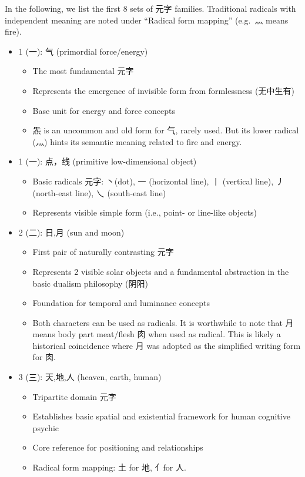 \documentclass[
]{article}
\providecommand{\tightlist}{%
  \setlength{\itemsep}{0pt}\setlength{\parskip}{0pt}}
\begin{document}
In the following, we list the first 8 sets of 元字 families. Traditional
radicals with independent meaning are noted under ``Radical form
mapping'' (e.g.~灬 means fire).

\begin{itemize}
\item
  1 (一): 气 (primordial force/energy)

  \begin{itemize}
  \tightlist
  \item
    The most fundamental 元字
  \item
    Represents the emergence of invisible form from formlessness
    (无中生有)
  \item
    Base unit for energy and force concepts
  \item
    炁 is an uncommon and old form for 气, rarely used. But its lower
    radical (灬) hints its semantic meaning related to fire and energy.
  \end{itemize}
\item
  1 (一): 点，线 (primitive low-dimensional object)

  \begin{itemize}
  \tightlist
  \item
    Basic radicals 元字: 丶(dot), 一 (horizontal line), 丨 (vertical
    line), 丿 (north-east line), 乀 (south-east line)
  \item
    Represents visible simple form (i.e., point- or line-like objects)
  \end{itemize}
\item
  2 (二): 日,月 (sun and moon)

  \begin{itemize}
  \tightlist
  \item
    First pair of naturally contrasting 元字
  \item
    Represents 2 visible solar objects and a fundamental abstraction in
    the basic dualism philosophy (阴阳)
  \item
    Foundation for temporal and luminance concepts
  \item
    Both characters can be used as radicals. It is worthwhile to note
    that 月 means body part meat/flesh 肉 when used as radical. This is
    likely a historical coincidence where 月 was adopted as the
    simplified writing form for 肉.
  \end{itemize}
\item
  3 (三): 天,地,人 (heaven, earth, human)

  \begin{itemize}
  \tightlist
  \item
    Tripartite domain 元字
  \item
    Establishes basic spatial and existential framework for human
    cognitive psychic
  \item
    Core reference for positioning and relationships
  \item
    Radical form mapping: 土 for 地, 亻for 人.
  \end{itemize}


\end{itemize}
\end{document}

